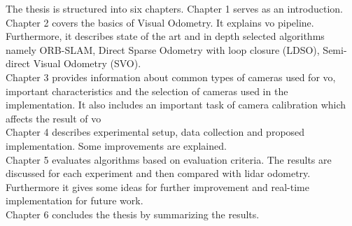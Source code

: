 The thesis is structured into six chapters. Chapter 1 serves as an introduction.\\
\newline 
Chapter 2 covers the basics of Visual Odometry. It explains \acrshort{vo} pipeline. Furthermore, it describes state of the art and in depth selected algorithms namely ORB-SLAM, Direct Sparse Odometry with loop closure (LDSO), Semi-direct Visual Odometry (SVO).\\  
\newline 
Chapter 3 provides information about common types of cameras used for \acrshort{vo}, important characteristics and the selection of cameras used in the implementation. It also includes an important task of camera calibration which affects the result of \acrshort{vo}\\
\newline 
Chapter 4 describes experimental setup, data collection and proposed implementation. Some improvements are explained.\\
\newline
Chapter 5 evaluates algorithms based on evaluation criteria. The results are discussed for each experiment and then compared with \acrshort{lidar} odometry. Furthermore it gives some ideas for further improvement and real-time implementation for future work.\\
\newline
Chapter 6 concludes the thesis by summarizing the results.